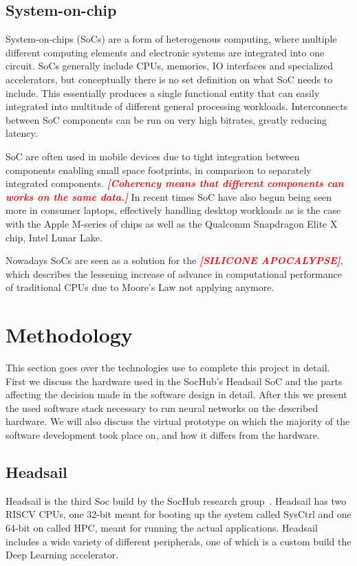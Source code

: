 \documentclass[12pt,a4paper,english
]{tunithesis}
\newcommand{\fixthis}[1]{\textbf{\textit{\textcolor{red}{[#1]}}}}
\begin{document}
\section{System-on-chip}
System-on-chips (SoCs) are a form of heterogenous computing, where multiple different computing elements and electronic systems are integrated into one circuit.
SoCs generally include CPUs, memories, IO interfaces and specialized accelerators, but conceptually there is no set definition on what SoC needs to include.
This essentially produces a single functional entity that can easily integrated into multitude of different general processing workloads.
Interconnects between SoC components can be run on very high bitrates, greatly reducing latency.

SoC are often used in mobile devices due to tight integration between components enabling small space footprints, in comparison to separately integrated components.
\fixthis{Coherency means that different components can works on the same data.}
In recent times SoC have also begun being seen more in consumer laptops, effectively handling desktop workloads as is the case with the Apple M-series of chips as well as the Qualcomm Snapdragon Elite X chip, Intel Lunar Lake.

Nowadays SoCs are seen as a solution for the \fixthis{SILICONE APOCALYPSE}, which describes the lessening increase of advance in computational performance of traditional CPUs due to Moore's Law not applying anymore.

\chapter{Methodology}
This section goes over the technologies use to complete this project in detail. First we discuss the hardware used in the SocHub's Headsail SoC and the parts affecting the decision made in the software design in detail. After this we present the used software stack necessary to run neural networks on the described hardware. We will also discuss the virtual prototype on which the majority of the software development took place on, and how it differs from the hardware.
\label{ch:methodology}

\section{Headsail}
Headsail is the third Soc build by the SocHub research group~\parencite{Ballast}. Headsail has two RISCV CPUs, one 32-bit meant for booting up the system called SysCtrl and one 64-bit on called HPC, meant for running the actual applications.
Headsail includes a wide variety of different peripherals, one of which is a custom build the Deep Learning accelerator.
\end{document}
